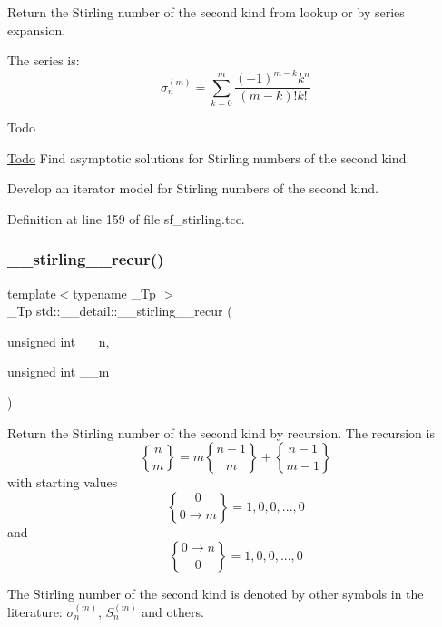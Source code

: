 Return the Stirling number of the second kind from lookup or by series expansion.

The series is\+: \[ \sigma_n^{(m)} = \sum_{k=0}^{m}\frac{(-1)^{m-k}k^n}{(m-k)!k!} \]

\begin{DoxyRefDesc}{Todo}
\item[\hyperlink{todo__todo000016}{Todo}]Find asymptotic solutions for Stirling numbers of the second kind. 

Develop an iterator model for Stirling numbers of the second kind. \end{DoxyRefDesc}


Definition at line 159 of file sf\+\_\+stirling.\+tcc.

\mbox{\label{namespacestd_1_1____detail_a23c6eb236cd8ddcfbe43e66ac23324db}} 
\subsubsection{\texorpdfstring{\+\_\+\+\_\+stirling\+\_\+\_\+recur()}{\_\_stirling\_2\_recur()}}
{\footnotesize\ttfamily template$<$typename \+\_\+\+Tp $>$ \\
\+\_\+\+Tp std\+::\+\_\+\+\_\+detail\+::\+\_\+\+\_\+stirling\+\_\+\_\+recur (\begin{DoxyParamCaption}\item[{unsigned int}]{\+\_\+\+\_\+n,  }\item[{unsigned int}]{\+\_\+\+\_\+m }\end{DoxyParamCaption})}

Return the Stirling number of the second kind by recursion. The recursion is \[ \newcommand{\stirling}[2]{\genfrac{\{}{\}}{0pt}{0}{#1}{#2}} \stirling{n}{m} = m \stirling{n-1}{m} + \stirling{n-1}{m-1} \] with starting values \[ \newcommand{\stirling}[2]{\genfrac{\{}{\}}{0pt}{0}{#1}{#2}} \stirling{0}{0\rightarrow m} = {1, 0, 0, ..., 0} \] and \[ \newcommand{\stirling}[2]{\genfrac{\{}{\}}{0pt}{0}{#1}{#2}} \stirling{0\rightarrow n}{0} = {1, 0, 0, ..., 0} \]

The Stirling number of the second kind is denoted by other symbols in the literature\+: $ \sigma_n^{(m)} $, $ \textit{S}_n^{(m)} $ and others. 

